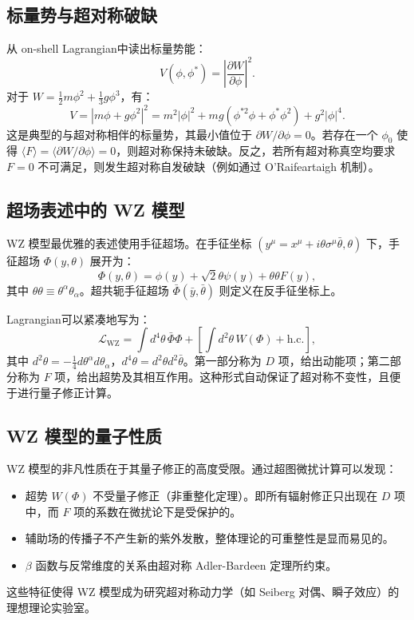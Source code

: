 \subsection*{标量势与超对称破缺}

从 on-shell Lagrangian中读出标量势能：
\begin{equation}
V(\phi, \phi^\ast) = \left| \frac{\partial W}{\partial\phi} \right|^2.
\end{equation}
对于 $W = \frac12 m\phi^2 + \frac13 g\phi^3$，有：
\begin{equation}
V = |m\phi + g\phi^2|^2 = m^2 |\phi|^2 + mg(\phi^{\ast2}\phi + \phi^\ast\phi^2) + g^2|\phi|^4.
\end{equation}
这是典型的与超对称相伴的标量势，其最小值位于 $\partial W/\partial\phi = 0$。若存在一个 $\phi_0$ 使得 $\langle F \rangle = \langle \partial W/\partial\phi \rangle = 0$，则超对称保持未破缺。反之，若所有超对称真空均要求 $F=0$ 不可满足，则发生超对称自发破缺（例如通过 O'Raifeartaigh 机制）。

\subsection*{超场表述中的 WZ 模型}

WZ 模型最优雅的表述使用手征超场。在手征坐标 $(y^\mu = x^\mu + i\theta\sigma^\mu\bar\theta, \theta)$ 下，手征超场 $\Phi(y,\theta)$ 展开为：
\begin{equation}
\Phi(y,\theta) = \phi(y) + \sqrt{2}\theta\psi(y) + \theta\theta F(y),
\end{equation}
其中 $\theta\theta \equiv \theta^\alpha\theta_\alpha$。超共轭手征超场 $\bar\Phi(\bar y,\bar\theta)$ 则定义在反手征坐标上。

Lagrangian可以紧凑地写为：
\begin{equation}
\mathcal{L}_{\text{WZ}} = \int d^4\theta \, \bar\Phi\Phi + \left[ \int d^2\theta \, W(\Phi) + \text{h.c.} \right],
\end{equation}
其中 $d^2\theta = -\frac14 d\theta^\alpha d\theta_\alpha$，$d^4\theta = d^2\theta d^2\bar\theta$。第一部分称为 $D$ 项，给出动能项；第二部分称为 $F$ 项，给出超势及其相互作用。这种形式自动保证了超对称不变性，且便于进行量子修正计算。

\subsection*{WZ 模型的量子性质}

WZ 模型的非凡性质在于其量子修正的高度受限。通过超图微扰计算可以发现：
\begin{itemize}
\item 超势 $W(\Phi)$ 不受量子修正（非重整化定理）。即所有辐射修正只出现在 $D$ 项中，而 $F$ 项的系数在微扰论下是受保护的。
\item 辅助场的传播子不产生新的紫外发散，整体理论的可重整性是显而易见的。
\item $\beta$ 函数与反常维度的关系由超对称 Adler-Bardeen 定理所约束。
\end{itemize}
这些特征使得 WZ 模型成为研究超对称动力学（如 Seiberg 对偶、瞬子效应）的理想理论实验室。






